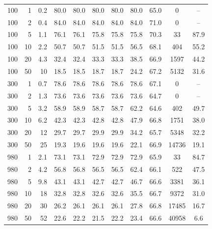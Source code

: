{\begin{tabular}{@{}rrr|cc|cc|c|c|cc@{}}
100 & 1 & 0.2 & 80.0 & 80.0 & 80.0 & 80.0 & 80.0 & 65.0 & 0 & -- \\
100 & 2 & 0.4 & 84.0 & 84.0 & 84.0 & 84.0 & 84.0 & 71.0 & 0 & -- \\
100 & 5 & 1.1 & 76.1 & 76.1 & 75.8 & 75.8 & 75.8 & 70.3 & 33 & 87.9 \\
100 & 10 & 2.2 & 50.7 & 50.7 & 51.5 & 51.5 & 56.5 & 68.1 & 404 & 55.2 \\
100 & 20 & 4.3 & 32.4 & 32.4 & 33.3 & 33.3 & 38.5 & 66.9 & 1597 & 44.2 \\
100 & 50 & 10 & 18.5 & 18.5 & 18.7 & 18.7 & 24.2 & 67.2 & 5132 & 31.6 \\
300 & 1 & 0.7 & 78.6 & 78.6 & 78.6 & 78.6 & 78.6 & 67.1 & 0 & -- \\
300 & 2 & 1.3 & 73.6 & 73.6 & 73.6 & 73.6 & 73.6 & 64.7 & 0 & -- \\
300 & 5 & 3.2 & 58.9 & 58.9 & 58.7 & 58.7 & 62.2 & 64.6 & 402 & 49.7 \\
300 & 10 & 6.2 & 42.3 & 42.3 & 42.8 & 42.8 & 47.9 & 66.8 & 1751 & 38.0 \\
300 & 20 & 12 & 29.7 & 29.7 & 29.9 & 29.9 & 34.2 & 65.7 & 5348 & 32.2 \\
300 & 50 & 25 & 19.3 & 19.6 & 19.6 & 19.6 & 22.1 & 66.9 & 14736 & 19.1 \\
980 & 1 & 2.1 & 73.1 & 73.1 & 72.9 & 72.9 & 72.9 & 65.9 & 33 & 84.7 \\
980 & 2 & 4.2 & 56.8 & 56.8 & 56.5 & 56.5 & 62.4 & 66.1 & 522 & 47.5 \\
980 & 5 & 9.8 & 43.1 & 43.1 & 42.7 & 42.7 & 46.7 & 66.6 & 3381 & 36.1 \\
980 & 10 & 18 & 32.8 & 32.8 & 32.6 & 32.6 & 35.5 & 66.7 & 9372 & 31.0 \\
980 & 20 & 30 & 26.2 & 26.1 & 26.1 & 26.1 & 27.8 & 66.8 & 17485 & 16.7 \\
980 & 50 & 52 & 22.6 & 22.2 & 21.5 & 22.2 & 23.4 & 66.6 & 40958 & 6.6 \\
\hline
\end{tabular}}%
